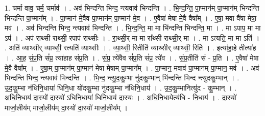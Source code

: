 \documentclass[17pt]{extarticle}
\begin{document}
1. चर्मा वाव॒ चर्म॒ चर्माव॑ । . अव॑ भिन्दन्ति भिन्द॒ न्त्यवाव॑ भिन्दन्ति । . भि॒न्द॒न्ति॒ पा॒प्मान॑म् पा॒प्मान॑म् भिन्दन्ति भिन्दन्ति पा॒प्मान᳚म् । . पा॒प्मान॑ मे॒वैव पा॒प्मान॑म् पा॒प्मान॑ मे॒व । . ए॒वैषा॑ मेषा मे॒वै वैषा᳚म् । . ए॒षा॒ मवा वै॑षा मेषा॒ मव॑ । . अव॑ भिन्दन्ति भिन्द॒ न्त्यवाव॑ भिन्दन्ति । . भि॒न्द॒न्ति॒ मा मा भि॑न्दन्ति भिन्दन्ति॒ मा । . मा ऽपाप॒ मा मा ऽप॑ । . अप॑ राथ्सी राथ्सी॒ रपाप॑ राथ्सीः । . रा॒थ्सी॒र् मा मा रा᳚थ्सी राथ्सी॒र् मा । . मा ऽत्यति॒ मा मा ऽति॑ । . अति॑ व्याथ्सीर् व्याथ्सी॒ रत्यति॑ व्याथ्सीः । . व्या॒थ्सी॒ रितीति॑ व्याथ्सीर् व्याथ्सी॒ रिति॑ । . इत्या॑हा॒हे तीत्या॑ह । . आ॒ह॒ सं॒प्र॒ति सं॑प्र॒ त्या॑हाह संप्र॒ति । . सं॒प्र॒ त्ये॑वैव सं॑प्र॒ति सं॑प्र॒ त्ये॑व । . सं॒प्र॒तीति॑ सं - प्र॒ति । . ए॒वैषा॑ मेषा मे॒वै वैषा᳚म् । . ए॒षा॒म् पा॒प्मान॑म् पा॒प्मान॑ मेषा मेषाम् पा॒प्मान᳚म् । . पा॒प्मान॒ मवाव॑ पा॒प्मान॑म् पा॒प्मान॒ मव॑ । . अव॑ भिन्दन्ति भिन्द॒ न्त्यवाव॑ भिन्दन्ति । . भि॒न्द॒ न्त्यु॒द॒कु॒म्भा नु॑दकु॒म्भान् भि॑न्दन्ति भिन्द न्त्युदकु॒म्भान् । . उ॒द॒कु॒म्भा न॑धिनि॒धाया॑ धिनि॒धा यो॑दकु॒म्भा नु॑दकु॒म्भा न॑धिनि॒धाय॑ । . उ॒द॒कु॒म्भानित्यु॑द - कु॒म्भान् । . अ॒धि॒नि॒धाय॑ दा॒स्यो॑ दा॒स्यो॑ ऽधिनि॒धाया॑ धिनि॒धाय॑ दा॒स्यः॑ । . अ॒धि॒नि॒धायेत्य॑धि - नि॒धाय॑ । . दा॒स्यो॑ मार्जा॒लीय॑म् मार्जा॒लीय॑म् दा॒स्यो॑ दा॒स्यो॑ मार्जा॒लीय᳚म् । \newline
\end{document}
